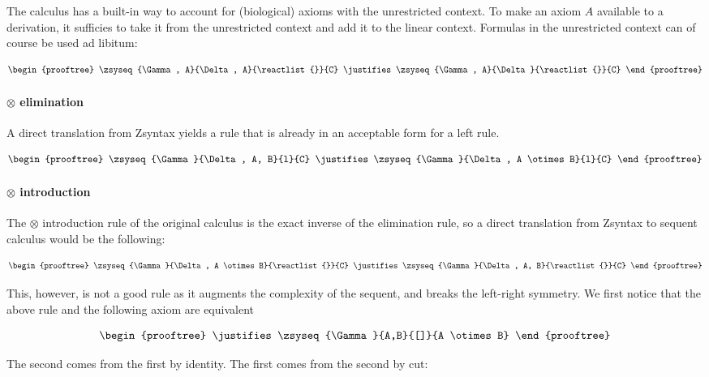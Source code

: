 The calculus has a built-in way to account for (biological) axioms with the
unrestricted context. To make an axiom $A$ available to a derivation, it
sufficies to take it from the unrestricted context and add it to the linear
context. Formulas in the unrestricted context can of course be used ad libitum:

\[
  \begin{prooftree}
    \zsyseq{\Gamma, A}{\Delta, A}{\reactlist{}}{C}
    \justifies
    \zsyseq{\Gamma, A}{\Delta}{\reactlist{}}{C}
  \end{prooftree}
\]

\paragraph{$\otimes$ elimination}

A direct translation from Zsyntax yields a rule that is already in an acceptable
form for a left rule.

\[
  \begin{prooftree}
    \zsyseq{\Gamma}{\Delta, A, B}{l}{C}
    \justifies
    \zsyseq{\Gamma}{\Delta, A \otimes B}{l}{C}
  \end{prooftree}
\]

\paragraph{$\otimes$ introduction}

The $\otimes$ introduction rule of the original calculus is the exact inverse of
the elimination rule, so a direct translation from Zsyntax to sequent calculus
would be the following:

\[
  \begin{prooftree}
    \zsyseq{\Gamma}{\Delta, A \otimes B}{\reactlist{}}{C}
    \justifies
    \zsyseq{\Gamma}{\Delta, A, B}{\reactlist{}}{C}
  \end{prooftree}
\]

This, however, is not a good rule as it augments the complexity of the sequent,
and breaks the left-right symmetry. We first notice that the above rule and the
following axiom are equivalent

\[
  \begin{prooftree}
    \justifies
    \zsyseq{\Gamma}{A,B}{[]}{A \otimes B}
  \end{prooftree}
\]

The second comes from the first by identity. The first comes from the second by
cut:

